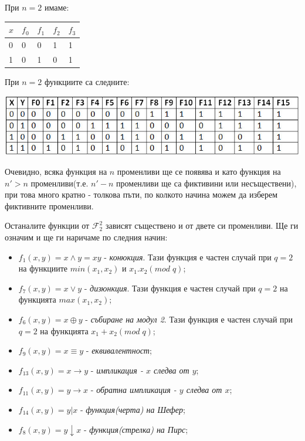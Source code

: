 \documentclass[11pt]{article} %
\begin{document}
При $n = 2$ имаме: 
\begin{table}[!ht]
\centering
\begin{tabular}{|l|llll|}
\hline
$x$ & $f_{0}$ & $f_{1}$ & $f_{2}$ &  $f_{3}$\\ \hline
0 & 0 & 0 & 1 & 1  \\
1 & 0 & 1 & 0 & 1 \\ \hline
\end{tabular}
\end{table}

\newpage
При $n = 2$ функциите са следните:
\begin{center}
\includegraphics[scale=0.65]{twoVars.jpg}
\end{center}

Очевидно, всяка функция на $n$ променливи ще се появява и като функция на $n' > n$ променливи(т.е. $n' - n$ променливи ще са фиктивини или несъществени), при това много кратно - толкова пъти, по колкото начина можем да изберем фиктивните променливи. \par

Останалите функции от $\mathcal{F}^{2}_{2}$ зависят съществено и от двете си променливи. Ще ги означим и ще ги наричаме по следния начин:

\begin{itemize}
	\item $f_{1}(x,y) = x \wedge y = xy$ - \textit{конюкция}. Тази функция е частен случай при $q = 2$ на функциите $min(x_{1}, x_{2})$ и $x_{1}.x_{2}(mod\;q)$;\\  
	\item $f_{7}(x,y) = x \vee y $ - \textit{дизюнкция}. Тази функция е частен случай при $q = 2$ на функцията $max(x_{1}, x_{2})$;\\  
	\item $f_{6}(x,y) = x \oplus y$ - \textit{събиране на модул 2}. Тази функция е частен случай при $q = 2$ на функцията $x_{1} + x_{2}(mod\;q)$;\\
	\item $f_{9}(x,y) = x \equiv y$ - \textit{еквивалентност};\\  
	\item $f_{13}(x,y) = x \to y$ - \textit{импликация - $x$ следва от $y$};\\
	\item $f_{11}(x,y) = y \to x$ - \textit{обратна импликация - $y$ следва от $x$};\\ 
	\item $f_{14}(x,y) = y | x$ - \textit{функция(черта) на Шефер};\\
	\item $f_{8}(x,y) = y \downarrow x$ - \textit{функция(стрелка) на Пирс};\\       
\end{itemize}
\end{document}
